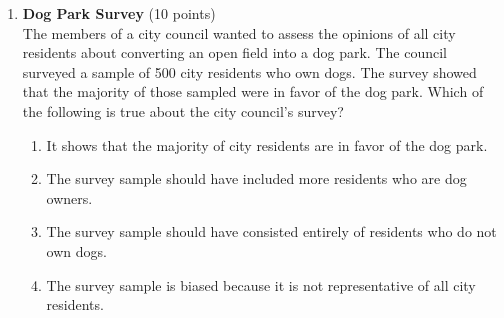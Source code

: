 \begin{enumerate}
  \item \textbf{Dog Park Survey} (10 points)\\
  The members of a city council wanted to assess the opinions of all city residents about converting an open field into a dog park. The council surveyed a sample of 500 city residents who own dogs. The survey showed that the majority of those sampled were in favor of the dog park. Which of the following is true about the city council's survey?
  \begin{enumerate}[label=(\Alph*)]
    \item It shows that the majority of city residents are in favor of the dog park.
    \item The survey sample should have included more residents who are dog owners.
    \item The survey sample should have consisted entirely of residents who do not own dogs.
    \item The survey sample is biased because it is not representative of all city residents.
  \end{enumerate}
  \begin{subanswer}
  \end{subanswer}
\end{enumerate}

